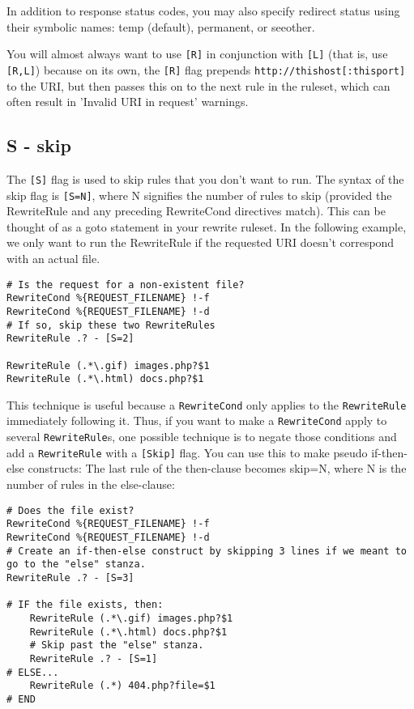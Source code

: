 In addition to response status codes, you may also specify redirect status using their symbolic names: temp (default), permanent, or seeother.

You will almost always want to use \verb~[R]~ in conjunction with \verb~[L]~ (that is, use \verb~[R,L]~) because on its own, the \verb~[R]~ flag prepends \verb~http://thishost[:thisport]~ to the URI, but then passes this on to the next rule in the ruleset, which can often result in 'Invalid URI in request' warnings.

\subsection{S - skip}
\label{sflag}

The \verb~[S]~ flag is used to skip rules that you don't want to run. The syntax of the skip flag is \verb~[S=N]~, where N signifies the number of rules to skip (provided the RewriteRule and any preceding RewriteCond directives match). This can be thought of as a goto statement in your rewrite ruleset. In the following example, we only want to run the RewriteRule if the requested URI doesn't correspond with an actual file.

\begin{verbatim}
# Is the request for a non-existent file?
RewriteCond %{REQUEST_FILENAME} !-f
RewriteCond %{REQUEST_FILENAME} !-d
# If so, skip these two RewriteRules
RewriteRule .? - [S=2]

RewriteRule (.*\.gif) images.php?$1
RewriteRule (.*\.html) docs.php?$1
\end{verbatim}

This technique is useful because a \verb~RewriteCond~ only applies to the \verb~RewriteRule~ immediately following it. Thus, if you want to make a \verb~RewriteCond~ apply to several \verb~RewriteRule~s, one possible technique is to negate those conditions and add a \verb~RewriteRule~ with a \verb~[Skip]~ flag. You can use this to make pseudo if-then-else constructs: The last rule of the then-clause becomes skip=N, where N is the number of rules in the else-clause:

\begin{verbatim}
# Does the file exist?
RewriteCond %{REQUEST_FILENAME} !-f
RewriteCond %{REQUEST_FILENAME} !-d
# Create an if-then-else construct by skipping 3 lines if we meant to go to the "else" stanza.
RewriteRule .? - [S=3]

# IF the file exists, then:
    RewriteRule (.*\.gif) images.php?$1
    RewriteRule (.*\.html) docs.php?$1
    # Skip past the "else" stanza.
    RewriteRule .? - [S=1]
# ELSE...
    RewriteRule (.*) 404.php?file=$1
# END
\end{verbatim}

